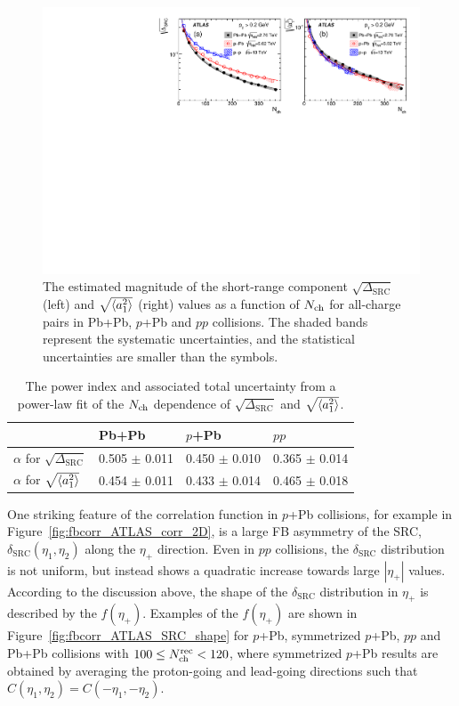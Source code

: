 \begin{figure}[H]
\centering
\includegraphics[width=.95\linewidth]{figs/chapter_fbcorr/ATLAS_SRC_LRC.pdf}
\caption{The estimated magnitude of the short-range component $\sqrt{\Delta_\text{SRC}}$  (left) and $\sqrt{\left\langle a_1^2\right\rangle}$ (right) values as a function of $N_\text{ch}$ for all-charge pairs in Pb+Pb, $p$+Pb and $pp$ collisions. The shaded bands represent the systematic uncertainties, and the statistical uncertainties are smaller than the symbols.}
\label{fig:fbcorr_ATLAS_SRC_LRC}
\end{figure}

\begin{table}[H]
\centering
\begin{tabular}{|llll|}
\hline
                                        & Pb+Pb                          & $p$+Pb                         & $pp$                           \\ \hline
$\alpha$ for $\sqrt{\Delta_\text{SRC}}$ & 0.505 $\pm$ 0.011 & 0.450 $\pm$ 0.010 & 0.365 $\pm$ 0.014 \\
$\alpha$ for $\sqrt{\left\langle a_1^2\right\rangle}$        & 0.454 $\pm$ 0.011 & 0.433 $\pm$ 0.014 & 0.465 $\pm$ 0.018 \\ \hline
\end{tabular}
\caption{The power index and associated total uncertainty from a power-law fit of the $N_\text{ch}$ dependence of $\sqrt{\Delta_\text{SRC}}$ and $\sqrt{\left\langle a_1^2\right\rangle}$.}
\label{table:fbcorr_ATLAS_power_index}
\end{table}

One striking feature of the correlation function in $p$+Pb collisions, for example in Figure~\ref{fig:fbcorr_ATLAS_corr_2D}, is a large FB asymmetry of the SRC, $\delta_\text{SRC}(\eta_1, \eta_2)$ along the $\eta_+$ direction. Even in $pp$ collisions, the $\delta_\text{SRC}$ distribution is not uniform, but instead shows a quadratic increase towards large $|\eta_+|$ values. According to the discussion above, the shape of the $\delta_\text{SRC}$ distribution in $\eta_+$ is described by the $f(\eta_+)$. Examples of the $f(\eta_+)$ are shown in Figure~\ref{fig:fbcorr_ATLAS_SRC_shape} for $p$+Pb, symmetrized $p$+Pb, $pp$ and Pb+Pb collisions with $100 \le N_\text{ch}^\text{rec} < 120$, where symmetrized $p$+Pb results are obtained by averaging the proton-going and lead-going directions such that $C(\eta_1, \eta_2) = C(-\eta_1, -\eta_2)$.

